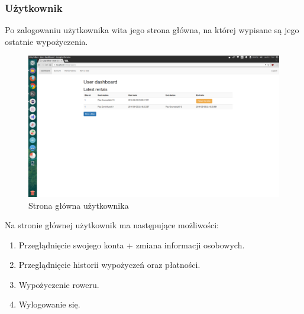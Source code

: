 \documentclass{article}
\begin{document}
\subsubsection{Użytkownik}
Po zalogowaniu użytkownika wita jego strona główna, na której wypisane są jego ostatnie wypożyczenia.
\begin{figure}[p]
\centerline{
	\includegraphics[width=\paperwidth, height=\paperheight, keepaspectratio]{screenshots/userdashboard.png}}
	\caption{Strona główna użytkownika}
\end{figure}
Na stronie głównej użytkownik ma następujące możliwości:
\begin{enumerate}
	\item Przeglądnięcie swojego konta + zmiana informacji osobowych.
	\item Przeglądnięcie historii wypożyczeń oraz płatności.
	\item Wypożyczenie roweru.
	\item Wylogowanie się.
\end{enumerate}
\end{document}
